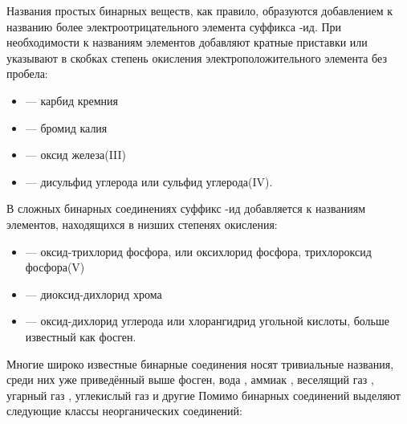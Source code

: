 Названия простых бинарных веществ, как правило, образуются добавлением к названию более электроотрицательного элемента суффикса -ид. При необходимости к названиям элементов добавляют кратные приставки или указывают в скобках степень окисления электроположительного элемента без пробела:
\begin{itemize}
\item {} — карбид кремния
\item {} — бромид калия
\item {} — оксид железа(III)
\item {} — дисульфид углерода или сульфид углерода(IV).
\end{itemize}
В сложных бинарных соединениях суффикс -ид добавляется к названиям элементов, находящихся в низших степенях окисления:
\begin{itemize}
\item {} — оксид-трихлорид фосфора, или оксихлорид фосфора, трихлороксид фосфора(V)
\item {} — диоксид-дихлорид хрома
\item {} — оксид-дихлорид углерода или хлорангидрид угольной кислоты, больше известный как фосген.
\end{itemize}
Многие широко известные бинарные соединения носят тривиальные названия, среди них уже приведённый выше фосген, вода , аммиак , веселящий газ , угарный газ , углекислый газ   и другие
Помимо бинарных соединений выделяют следующие классы неорганических соединений:
